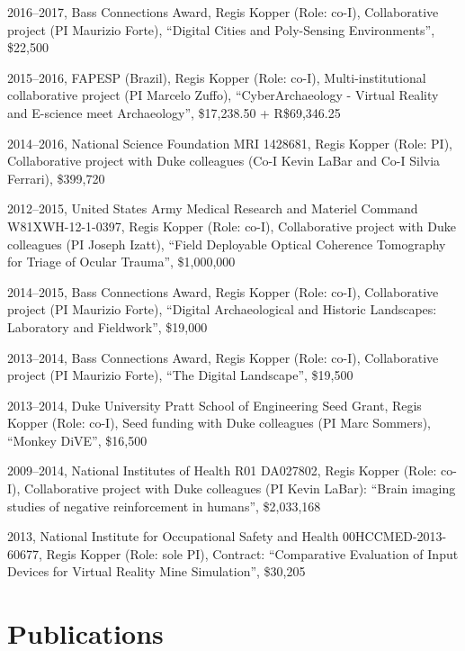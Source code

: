 \documentclass[wideaddress]{vitae}
\begin{document}
\begin{etaremune}
	\item{2016--2017, Bass Connections Award, Regis Kopper (Role: co-I), Collaborative project (PI Maurizio Forte), ``Digital Cities and Poly-Sensing Environments'', \$22,500}
	\item{2015--2016, FAPESP (Brazil), Regis Kopper (Role: co-I), Multi-institutional collaborative project (PI Marcelo Zuffo), ``CyberArchaeology - Virtual Reality and E-science meet Archaeology'', \$17,238.50 + R\$69,346.25}
	\item{2014--2016, National Science Foundation MRI 1428681, Regis Kopper (Role: PI), Collaborative project with Duke colleagues (Co-I Kevin LaBar and Co-I Silvia Ferrari), \$399,720}
	\item{2012--2015, United States Army Medical Research and Materiel Command W81XWH-12-1-0397, Regis Kopper (Role: co-I), Collaborative project with Duke colleagues (PI Joseph Izatt), ``Field Deployable Optical Coherence Tomography for Triage of Ocular Trauma'', \$1,000,000}
	\item{2014--2015, Bass Connections Award, Regis Kopper (Role: co-I), Collaborative project (PI Maurizio Forte), ``Digital Archaeological and Historic Landscapes: Laboratory and Fieldwork'', \$19,000}
	\item{2013--2014, Bass Connections Award, Regis Kopper (Role: co-I), Collaborative project (PI Maurizio Forte), ``The Digital Landscape'', \$19,500}
	\item{2013--2014, Duke University Pratt School of Engineering Seed Grant, Regis Kopper (Role: co-I), Seed funding with Duke colleagues (PI Marc Sommers), ``Monkey DiVE'', \$16,500}
	\item{2009--2014, National Institutes of Health R01 DA027802, Regis Kopper (Role: co-I), Collaborative project with Duke colleagues (PI Kevin LaBar): ``Brain imaging studies of negative reinforcement in humans'', \$2,033,168}
	\item{2013, National Institute for Occupational Safety and Health 00HCCMED-2013-60677, Regis Kopper (Role: sole PI), Contract: ``Comparative Evaluation of Input Devices for Virtual Reality Mine Simulation'', \$30,205}
\end{etaremune}

\section{Publications}
\end{document}

